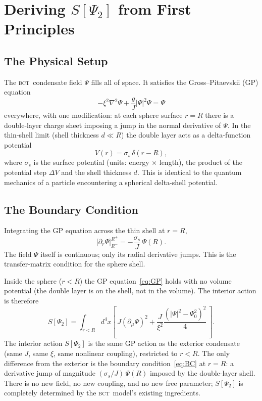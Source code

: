 \documentclass[aps,prl,preprint,superscriptaddress,floatfix]{revtex4-2}
\newcommand{\BCT}{\textsc{bct}}
\newcommand{\Psiint}{\Psi_2}
\newcommand{\Rsph}{R}
\begin{document}
\section{Deriving $S[\Psiint]$ from First Principles}
\label{sec:derivation}

\subsection{The Physical Setup}

The \BCT\ condensate field $\Psi$ fills all of space. It satisfies the
Gross--Pitaevskii (GP) equation
\begin{equation}
  -\xi^2\nabla^2\Psi + \frac{g}{J}|\Psi|^2\Psi = \Psi
  \label{eq:GP}
\end{equation}
everywhere, with one modification: at each sphere surface $r=\Rsph$ there is a
double-layer charge sheet imposing a jump in the normal derivative of $\Psi$. In
the thin-shell limit (shell thickness $d \ll \Rsph$) the double layer acts as a
delta-function potential
\begin{equation}
  V(r) = \sigma_s\,\delta(r-\Rsph),
  \label{eq:deltashell}
\end{equation}
where $\sigma_s$ is the surface potential (units: energy $\times$ length), the
product of the potential step $\Delta V$ and the shell thickness $d$. This is
identical to the quantum mechanics of a particle encountering a spherical
delta-shell potential.

\subsection{The Boundary Condition}

Integrating the GP equation across the thin shell at $r=\Rsph$,
\begin{equation}
  \big[\partial_r\Psi\big]_{\Rsph^-}^{\Rsph^+}
  = -\frac{\sigma_s}{J}\,\Psi(\Rsph).
  \label{eq:BC}
\end{equation}
The field $\Psi$ itself is continuous; only its radial derivative jumps. This is
the transfer-matrix condition for the sphere shell.

Inside the sphere ($r<\Rsph$) the GP equation~\eqref{eq:GP} holds with no volume
potential (the double layer is on the shell, not in the volume). The interior
action is therefore
\begin{equation}
  S[\Psiint] = \int_{r<\Rsph} d^4x
  \left[\, J(\partial_\mu\Psi)^2
  + \frac{J}{\xi^2}\frac{(|\Psi|^2 - \Psi_0^2)^2}{4}\,\right].
  \label{eq:action}
\end{equation}
The interior action $S[\Psiint]$ is the same GP action as the exterior
condensate (same $J$, same $\xi$, same nonlinear coupling), restricted to
$r<\Rsph$. The only difference from the exterior is the boundary
condition~\eqref{eq:BC} at $r=\Rsph$: a derivative jump of magnitude
$(\sigma_s/J)\,\Psi(\Rsph)$ imposed by the double-layer shell. There is no new
field, no new coupling, and no new free parameter; $S[\Psiint]$ is completely
determined by the \BCT\ model's existing ingredients.
\end{document}
